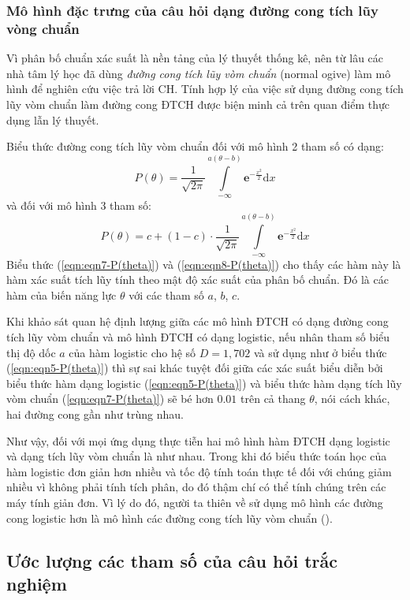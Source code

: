 \subsubsection{Mô hình đặc trưng của câu hỏi dạng đường cong tích lũy vòng chuẩn}
Vì phân bố chuẩn xác suất là nền tảng của lý thuyết thống kê, nên từ lâu các nhà tâm lý học đã dùng \textit{đường cong tích lũy vòm chuẩn} (normal ogive) làm mô hình để nghiên cứu việc trả lời CH. Tính hợp lý của việc sử dụng đường cong tích lũy vòm chuẩn làm đường cong ĐTCH được biện minh cả trên quan điểm thực dụng lẫn lý thuyết.\par
Biểu thức đường cong tích lũy vòm chuẩn đối với mô hình 2 tham số có dạng:
\begin{equation}\label{eqn:eqn7-P(theta)}
	P(\theta)=\frac{1}{\sqrt{2\pi}}\int\limits_{-\infty}^{a(\theta-b)}\mathbf{e}^{-\frac{x^2}{2}}\mathrm{d}x
\end{equation}
và đối với mô hình 3 tham số:
\begin{equation}\label{eqn:eqn8-P(theta)}
	P(\theta)=c+(1-c)\cdot\frac{1}{\sqrt{2\pi}}\int\limits_{-\infty}^{a(\theta-b)}\mathbf{e}^{-\frac{x^2}{2}}\mathrm{d}x
\end{equation}
Biểu thức (\ref{eqn:eqn7-P(theta)}) và (\ref{eqn:eqn8-P(theta)}) cho thấy các hàm này là hàm xác suất tích lũy tính theo mật độ xác suất của phân bố chuẩn. Đó là các hàm của biến năng lực $\theta$ với các tham số $a$, $b$, $c$.\par
Khi khảo sát quan hệ định lượng giữa các mô hình ĐTCH có dạng đường cong tích lũy vòm chuẩn và mô hình ĐTCH có dạng logistic, nếu nhân tham số biểu thị độ dốc $a$ của hàm logistic cho hệ số $D=1,702$ và sử dụng như ở biểu thức (\ref{eqn:eqn5-P(theta)}) thì sự sai khác tuyệt đối giữa các xác suất biểu diễn bởi biểu thức hàm dạng logistic (\ref{eqn:eqn5-P(theta)}) và biểu thức hàm dạng tích lũy vòm chuẩn (\ref{eqn:eqn7-P(theta)}) sẽ bé hơn $0.01$ trên cả thang $\theta$, nói cách khác, hai đường cong gần như trùng nhau.\par
Như vậy, đối với mọi ứng dụng thực tiễn hai mô hình hàm ĐTCH dạng logistic và dạng tích lũy vòm chuẩn là như nhau. Trong khi đó biểu thức toán học của hàm logistic đơn giản hơn nhiều và tốc độ tính toán thực tế đối với chúng giảm nhiều vì không phải tính tích phân, do đó thậm chí có thể tính chúng trên các máy tính giản đơn. Vì lý do đó, người ta thiên về sử dụng mô hình các đường cong logistic hơn là mô hình các đường cong tích lũy vòm chuẩn (\cite{thiep2011do}).
\subsection{Ước lượng các tham số của câu hỏi trắc nghiệm}
